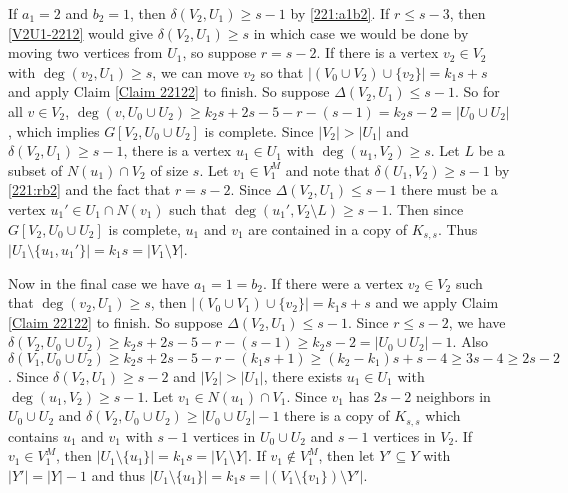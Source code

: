 \documentclass[oneside,12pt]{memoir}
\begin{document}
If $a_1=2$ and $b_2=1$, then $\delta(V_2, U_1)\geq s-1$ by \eqref{221:a1b2}.  If $r\leq s-3$, then \eqref{V2U1-2212} would give $\delta(V_2, U_1)\geq s$ in which case we would be done by moving two vertices from $U_1$, so suppose $r=s-2$. If there is a vertex $v_2\in V_2$ with $\deg(v_2, U_1)\geq s$, we can move $v_2$ so that $|(V_0\cup V_2) \cup \{v_2\}|=k_1s+s$ and apply Claim \ref{Claim 22122} to finish.  So suppose $\Delta(V_2, U_1)\leq s-1$. So for all $v\in V_2$, $\deg(v, U_0\cup U_2)\geq k_2s+2s-5-r-(s-1)=k_2s-2=|U_0\cup U_2|$, which implies $G[V_2, U_0\cup U_2]$ is complete.  
Since $|V_2|>|U_1|$ and $\delta(V_2, U_1)\geq s-1$, there is a vertex $u_1\in U_1$ with $\deg(u_1, V_2)\geq s$.  Let $L$ be a subset of $N(u_1)\cap V_2$ of size $s$.  Let $v_1\in V_1^M$ and note that $\delta(U_1, V_2)\geq s-1$ by \eqref{221:rb2} and the fact that $r=s-2$.  Since $\Delta(V_2, U_1)\leq s-1$ there must be a vertex $u_1'\in U_1\cap N(v_1)$ such that $\deg(u_1', V_2\setminus L)\geq s-1$.   Then since $G[V_2, U_0\cup U_2]$ is complete, $u_1$ and $v_1$ are contained in a copy of $K_{s,s}$.  Thus $|U_1\setminus\{u_1, u_1'\}|=k_1s=|V_1\setminus Y|$.

Now in the final case we have $a_1=1=b_2$.  If there were a vertex $v_2\in V_2$ such that $\deg(v_2, U_1)\geq s$, then $|(V_0\cup V_1)\cup \{v_2\}|=k_1s+s$ and we apply Claim \ref{Claim 22122} to finish.  So suppose $\Delta(V_2, U_1)\leq s-1$.  Since $r\leq s-2$, we have $\delta(V_2, U_0\cup U_2)\geq k_2s+2s-5-r-(s-1)\geq k_2s-2=|U_0\cup U_2|-1$.  Also $\delta(V_1, U_0\cup U_2)\geq k_2s+2s-5-r-(k_1s+1)\geq(k_2-k_1)s+s-4\geq 3s-4\geq 2s-2$.  Since $\delta(V_2, U_1)\geq s-2$ and $|V_2|>|U_1|$, there exists $u_1\in U_1$ with $\deg(u_1, V_2)\geq s-1$.  Let $v_1\in N(u_1)\cap V_1$.  Since $v_1$ has $2s-2$ neighbors in $U_0\cup U_2$ and $\delta(V_2, U_0\cup U_2)\geq |U_0\cup U_2|-1$ there is a copy of $K_{s,s}$ which contains $u_1$ and $v_1$ with $s-1$ vertices in $U_0\cup U_2$ and $s-1$ vertices in $V_2$.  If $v_1\in V_1^M$, then $|U_1\setminus\{u_1\}|=k_1s=|V_1\setminus Y|$. If $v_1\notin V_1^M$, then let $Y'\subseteq Y$ with $|Y'|=|Y|-1$ and thus  $|U_1\setminus\{u_1\}|=k_1s=|(V_1\setminus\{v_1\})\setminus Y'|$.
\end{document}
